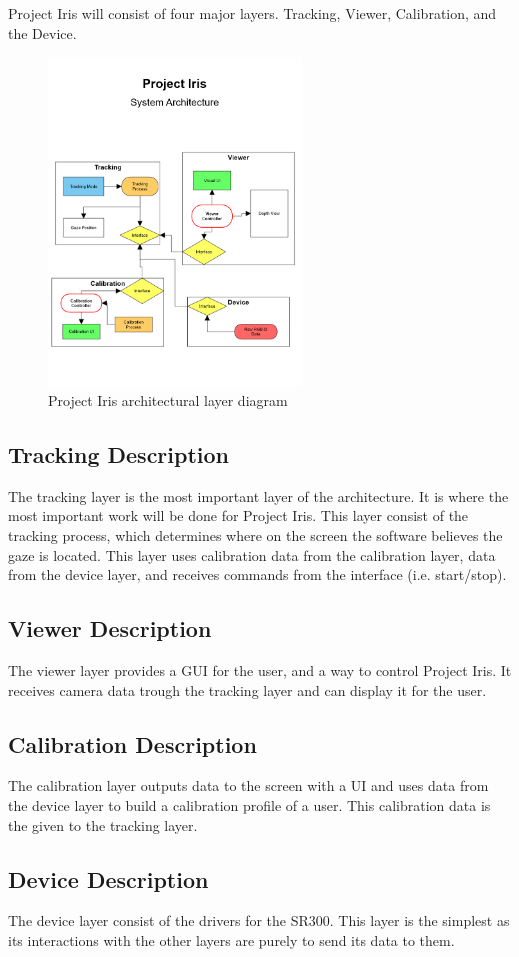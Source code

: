 Project Iris will consist of four major layers. Tracking, Viewer, Calibration, and the Device. 

\begin{figure}[h!]
	\centering
 	\includegraphics[width=0.60\textwidth]{images/system-architecture}
 \caption{Project Iris architectural layer diagram}
\end{figure}

\subsection{Tracking Description}
The tracking layer is the most important layer of the architecture. It is where the most important work will be done for Project Iris. This layer consist of the tracking process, which determines where on the screen the software believes the gaze is located. This layer uses calibration data from the calibration layer, data from the device layer, and receives commands from the interface (i.e. start/stop).

\subsection{Viewer Description}
The viewer layer provides a GUI for the user, and a way to control Project Iris. It receives camera data trough the tracking layer and can display it for the user.

\subsection{Calibration Description}
The calibration layer outputs data to the screen with a UI and uses data from the device layer to build a calibration profile of a user. This calibration data is the given to the tracking layer.

\subsection{Device Description}
The device layer consist of the drivers for the SR300. This layer is the simplest as its interactions with the other layers are purely to send its data to them. 